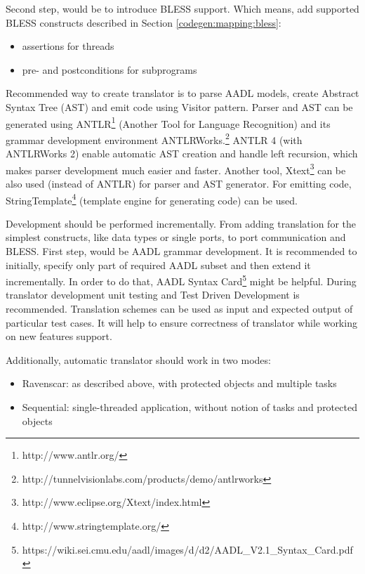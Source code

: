Second step, would be to introduce BLESS support. Which means, add supported BLESS constructs described in Section \ref{codegen:mapping:bless}:
\begin{itemize}
	\item assertions for threads
	\item pre- and postconditions for subprograms
\end{itemize}

Recommended way to create translator is to parse AADL models, create Abstract Syntax Tree (AST) and emit code using Visitor pattern. Parser and AST can be generated using ANTLR\footnote{http://www.antlr.org/} (Another Tool for Language Recognition) and its grammar development environment ANTLRWorks.\footnote{http://tunnelvisionlabs.com/products/demo/antlrworks} ANTLR 4 (with ANTLRWorks 2) enable automatic AST creation and handle left recursion, which makes parser development much easier and faster. Another tool, Xtext\footnote{http://www.eclipse.org/Xtext/index.html} can be also used (instead of ANTLR) for parser and AST generator. For emitting code, StringTemplate\footnote{http://www.stringtemplate.org/} (template engine for generating code) can be used. 

Development should be performed incrementally. From adding translation for the simplest constructs, like data types or single ports, to port communication and BLESS. First step, would be AADL grammar development. It is recommended to initially, specify only part of required AADL subset and then extend it incrementally. In order to do that, AADL Syntax Card\footnote{https://wiki.sei.cmu.edu/aadl/images/d/d2/AADL\_V2.1\_Syntax\_Card.pdf} might be helpful. During translator development unit testing and Test Driven Development is recommended. Translation schemes can be used as input and expected output of particular test cases. It will help to ensure correctness of translator while working on new features support.

Additionally, automatic translator should work in two modes:
\begin{itemize}
	\item Ravenscar: as described above, with protected objects and multiple tasks
	\item Sequential: single-threaded application, without notion of tasks and protected objects	
\end{itemize}
